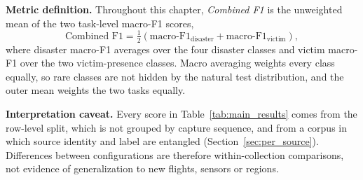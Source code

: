 \documentclass[journal]{IEEEtran}
\begin{document}
\textbf{Metric definition.} Throughout this chapter, \emph{Combined F1} is the unweighted mean of the two task-level macro-F1 scores,
\begin{equation}
    \text{Combined F1} = \tfrac{1}{2}\left(\text{macro-F1}_{\text{disaster}} + \text{macro-F1}_{\text{victim}}\right),
\end{equation}
where disaster macro-F1 averages over the four disaster classes and victim macro-F1 over the two victim-presence classes. Macro averaging weights every class equally, so rare classes are not hidden by the natural test distribution, and the outer mean weights the two tasks equally.

\textbf{Interpretation caveat.} Every score in Table~\ref{tab:main_results} comes from the row-level split, which is not grouped by capture sequence, and from a corpus in which source identity and label are entangled (Section~\ref{sec:per_source}). Differences between configurations are therefore within-collection comparisons, not evidence of generalization to new flights, sensors or regions.
\end{document}
